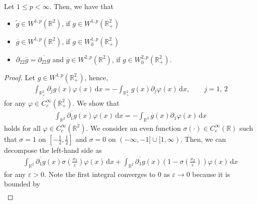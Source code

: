 \documentclass[10pt,a4paper]{amsart}
\newcommand{\bbR}{\mathbb R}
\newcommand{\rd}{\partial}
\newcommand{\ud}{\mathrm{d}}
\begin{document}
	\begin{remark}\label{rmk:W1p-extension}
		Let $1 \leq p < \infty$. Then, we have that \begin{itemize}
			\item $\widetilde{g}\in W^{1,p}(\bbR^{2})$, if $g \in W^{1,p}(\bbR^{2}_{+})$
			\item  $\overline{g}\in W^{1,p}(\bbR^{2})$, if $g \in W^{1,p}_{0}(\bbR^{2}_{+})$ 
			\item $\rd_{22}\overline{g} = \overline{\rd_{22}g}$ and $\overline{g} \in W^{2,p}(\bbR^2)$, if $g \in W^{2,p}_{0}(\bbR^{2}_{+})$. 
		\end{itemize}
	\end{remark}

	\begin{proof}
		Let $g \in W^{1,p}(\bbR^{2}_{+})$, hence, \begin{equation}\label{eq:weak_der}
			\begin{aligned}
				\int_{\bbR^2_{+}} \partial_j g(x) \varphi(x) \,\ud x = - \int_{\bbR^2_{+}} g(x) \partial_j \varphi(x) \,\ud x, \qquad j = 1,\, 2
			\end{aligned}
		\end{equation} for any $\varphi \in C^{\infty}_c(\bbR^2_{+})$. We show that \begin{equation*}
			\begin{aligned}
				\int_{\bbR^2} \overline{\partial_1 g}(x) \varphi(x) \,\ud x = - \int_{\bbR^2} \overline{g}(x) \partial_1 \varphi(x) \,\ud x
			\end{aligned}
		\end{equation*} holds for all $\varphi \in C^{\infty}_c(\bbR^2)$. We consider an even function $\sigma(\cdot) \in C^{\infty}_c(\bbR)$ such that $\sigma = 1$ on $[-\frac{1}{2},\frac{1}{2}]$ and $\sigma = 0$ on $(-\infty,-1] \cup [1,\infty)$. Then, we can decompose the left-hand side as \begin{equation*}
			\begin{aligned}
				\int_{\bbR^2} \overline{\partial_1 g}(x) \sigma(\frac{x_2}{\varepsilon}) \varphi(x) \,\ud x + \int_{\bbR^2} \overline{\partial_1 g}(x) (1-\sigma(\frac{x_2}{\varepsilon})) \varphi(x) \,\ud x
			\end{aligned}
		\end{equation*} for any $\varepsilon > 0$. Note the first integral converges to $0$ as $\varepsilon \to 0$ because it is bounded by \begin{equation}\label{eq:sigma_1}
			\begin{aligned}

\end{aligned}
\end{equation}
\end{proof}
\end{document}
